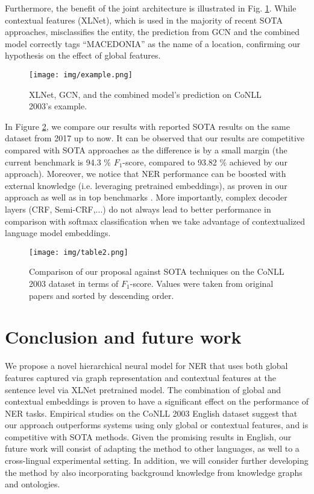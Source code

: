 \documentclass[runningheads]{llncs}
\begin{document}
Furthermore, the benefit of the joint architecture is illustrated in Fig. \ref{fig:comp}. While contextual features (XLNet), which is used in the majority of recent SOTA approaches, misclassifies the entity, the prediction from GCN and the combined model correctly tags ``MACEDONIA'' as the name of a location, confirming our hypothesis on the effect of global features.



\begin{figure}[ht]
  \centering
  \texttt{[image: img/example.png]}
  \vspace{-0.3cm}
  \caption{XLNet, GCN, and the combined model's prediction on CoNLL 2003's example.}
  \label{fig:comp}
\end{figure}




In Figure \ref{fig:method-comparison}, we compare our results with reported SOTA results on the same dataset from 2017 up to now. It can be observed that our results are competitive compared with SOTA approaches as the difference is by a small margin (the current benchmark is 94.3 \% $F_1$-score, compared to 93.82 \%  achieved by our approach). Moreover, we notice that NER performance can be boosted with external knowledge (i.e. leveraging pretrained embeddings), as proven in our approach as well as in top benchmarks \cite{liu2019towards,liu2019gcdt,luo2020hierarchical}. More importantly, complex decoder layers (CRF, Semi-CRF,...) do not always lead to better performance in comparison with softmax classification when we take advantage of contextualized language model embeddings.

\begin{figure}[ht]
  \centering
  \texttt{[image: img/table2.png]}
    \vspace{-0.3cm}
  \caption{Comparison of our proposal against SOTA techniques on the CoNLL 2003 dataset in terms of $F_1$-score. Values were taken from original papers and sorted by descending order.}
  \label{fig:method-comparison}
\end{figure}




\vspace{-0.3cm}
\section{Conclusion and future work}
\label{sec:conclusion}
We propose a novel hierarchical neural model for NER that uses both global features captured via graph representation and contextual features at the sentence level via XLNet pretrained model. The combination of global and contextual embeddings is proven to have a significant effect on the performance of NER tasks. Empirical studies on the CoNLL 2003 English dataset suggest that our approach outperforms systems using only global or contextual features, and is competitive with SOTA methods. Given the promising results in English, our future work will consist of adapting the method to other languages, as well to a cross-lingual experimental setting. In addition, we will consider further developing the method by also incorporating background knowledge from knowledge graphs and ontologies.
\end{document}
